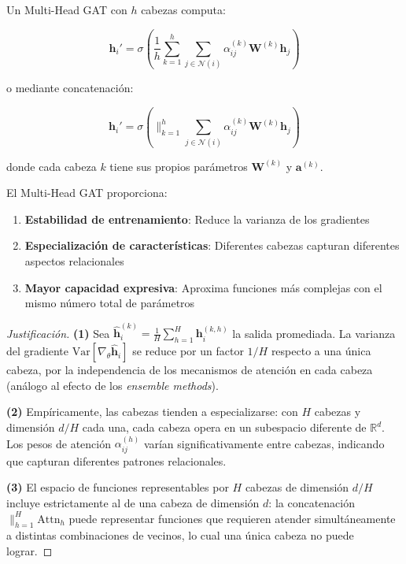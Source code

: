 \begin{definition}\label{def:multihead_gat}
Un Multi-Head GAT con $h$ cabezas computa:

\begin{equation}
    \mathbf{h}_i' = \sigma\left(\frac{1}{h}\sum_{k=1}^{h} \sum_{j \in \mathcal{N}(i)} \alpha_{ij}^{(k)} \mathbf{W}^{(k)}\mathbf{h}_j\right)
    \label{eq:multihead_gat_average}
\end{equation}

o mediante concatenación:

\begin{equation}
    \mathbf{h}_i' = \sigma\left(\|_{k=1}^{h} \sum_{j \in \mathcal{N}(i)} \alpha_{ij}^{(k)} \mathbf{W}^{(k)}\mathbf{h}_j\right)
    \label{eq:multihead_gat_concat}
\end{equation}

donde cada cabeza $k$ tiene sus propios parámetros $\mathbf{W}^{(k)}$ y $\mathbf{a}^{(k)}$.
\end{definition}

\begin{proposition}\label{prop:multihead_gat_advantages}
El Multi-Head GAT proporciona:
\begin{enumerate}
    \item \textbf{Estabilidad de entrenamiento}: Reduce la varianza de los gradientes
    \item \textbf{Especialización de características}: Diferentes cabezas capturan diferentes aspectos relacionales
    \item \textbf{Mayor capacidad expresiva}: Aproxima funciones más complejas con el mismo número total de parámetros
\end{enumerate}
\end{proposition}

\begin{proof}[Justificación]
\textbf{(1)} Sea $\hat{\mathbf{h}}_i^{(k)} = \frac{1}{H}\sum_{h=1}^H \mathbf{h}_i^{(k,h)}$ la salida promediada. La varianza del gradiente $\text{Var}[\nabla_\theta \hat{\mathbf{h}}_i]$ se reduce por un factor $1/H$ respecto a una única cabeza, por la independencia de los mecanismos de atención en cada cabeza (análogo al efecto de los \textit{ensemble methods}).

\textbf{(2)} Empíricamente, las cabezas tienden a especializarse: con $H$ cabezas y dimensión $d/H$ cada una, cada cabeza opera en un subespacio diferente de $\mathbb{R}^d$. Los pesos de atención $\alpha_{ij}^{(h)}$ varían significativamente entre cabezas, indicando que capturan diferentes patrones relacionales.

\textbf{(3)} El espacio de funciones representables por $H$ cabezas de dimensión $d/H$ incluye estrictamente al de una cabeza de dimensión $d$: la concatenación $\|_{h=1}^H \text{Attn}_h$ puede representar funciones que requieren atender simultáneamente a distintas combinaciones de vecinos, lo cual una única cabeza no puede lograr.
\end{proof}

